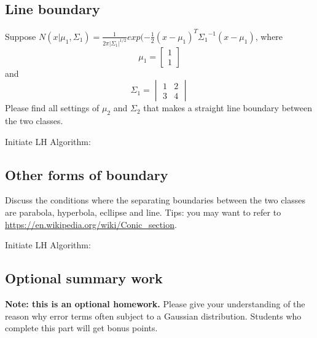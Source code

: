 \documentclass{article}
\newenvironment{answer}{\par\color{ForestGreen}}{\par}
\begin{document}
\subsection{Line boundary}
Suppose $N(x|\mu_1, \Sigma_1) = \frac{1}{{2\pi|\Sigma_1|}^{1/2}}exp{(-\frac{1}{2} (x - \mu_1)^T{\Sigma_1}^{-1}(x - \mu_1)}$, where
$$\mu_1 = \begin{bmatrix}1 \\ 1\end{bmatrix} $$
and $$\Sigma_1 = \begin{vmatrix}1 & 2 \\ 3 &4\end{vmatrix} $$
Please find all settings of $\mu_2$ and $\Sigma_2$ that makes a straight line boundary between the two classes.
\begin{answer}
    Initiate LH Algorithm:
\end{answer}

\subsection{Other forms of boundary}
Discuss the conditions where the separating boundaries between the two classes are parabola,
hyperbola, ecllipse and line. Tips: you may want to refer to \url{ https://en.wikipedia.org/wiki/Conic_section}.
\begin{answer}
    Initiate LH Algorithm:
\end{answer}

\subsection{Optional summary work}
\textbf{Note: this is an optional homework.} Please give your understanding of the reason
why error terms often subject to a Gaussian distribution. Students who complete this part
will get bonus points.
\end{document}
